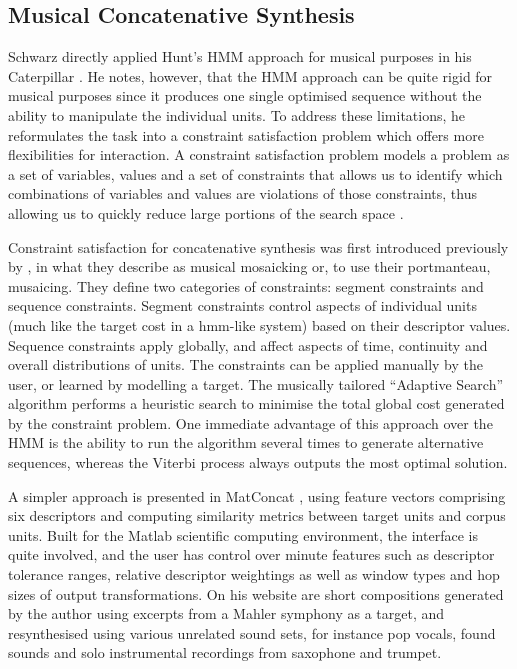 \subsection{Musical Concatenative Synthesis}
\label{sec:zilsone}
 
Schwarz directly applied Hunt’s HMM approach for musical purposes in his Caterpillar \citep{Schwarz2003}. He notes, however, that the HMM approach can be quite rigid for musical purposes since it produces one single optimised sequence without the ability to manipulate the individual units. To address these limitations, he reformulates the task into a constraint satisfaction problem which offers more flexibilities for interaction. A constraint satisfaction problem models a problem as a set of variables, values and a set of constraints that allows us to identify which combinations of variables and values are violations of those constraints, thus allowing us to quickly reduce large portions of the search space \citep{Russell2002}. 



Constraint satisfaction for concatenative synthesis was first introduced previously by \cite{Zils2001}, in what they describe as musical mosaicking or, to use their portmanteau, musaicing. They define two categories of constraints: segment constraints and sequence constraints. Segment constraints control aspects of individual units (much like the target cost in a \acrshort{hmm}-like system) based on their descriptor values. Sequence constraints apply globally, and affect aspects of time, continuity and overall distributions of units. The constraints can be applied manually by the user, or learned by modelling a target. The musically tailored “Adaptive Search” algorithm performs a heuristic search to minimise the total global cost generated by the constraint problem. One immediate advantage of this approach over the HMM is the ability to run the algorithm several times to generate alternative sequences, whereas the Viterbi process always outputs the most optimal solution.

 A simpler approach is presented in MatConcat \citep{Sturm2004}, using feature vectors comprising six descriptors and computing similarity metrics between target units and corpus units. Built for the Matlab scientific computing environment, the interface is quite involved, and the user has control over minute features such as descriptor tolerance ranges, relative descriptor weightings as well as window types and hop sizes of output transformations. On his website are short compositions generated by the author using excerpts from a Mahler symphony as a target, and resynthesised using various unrelated sound sets, for instance pop vocals, found sounds and solo instrumental recordings from saxophone and trumpet.

